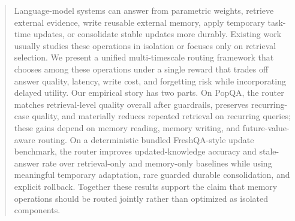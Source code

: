 \begin{abstract}
Language-model systems can answer from parametric weights, retrieve external evidence, write reusable external memory, apply temporary task-time updates, or consolidate stable updates more durably. Existing work usually studies these operations in isolation or focuses only on retrieval selection. We present a unified multi-timescale routing framework that chooses among these operations under a single reward that trades off answer quality, latency, write cost, and forgetting risk while incorporating delayed utility. Our empirical story has two parts. On PopQA, the router matches retrieval-level quality overall after guardrails, preserves recurring-case quality, and materially reduces repeated retrieval on recurring queries; these gains depend on memory reading, memory writing, and future-value-aware routing. On a deterministic bundled FreshQA-style update benchmark, the router improves updated-knowledge accuracy and stale-answer rate over retrieval-only and memory-only baselines while using meaningful temporary adaptation, rare guarded durable consolidation, and explicit rollback. Together these results support the claim that memory operations should be routed jointly rather than optimized as isolated components.
\end{abstract}
